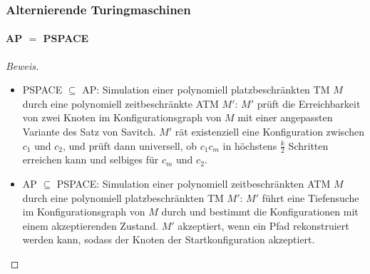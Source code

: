 \begin{frame}
    \frametitle{Alternierende Turingmaschinen}
    \framesubtitle{AP $=$ PSPACE}
    
    \begin{proof}[Beweis]
        \begin{itemize}
            \item PSPACE $\subseteq$ AP: Simulation einer polynomiell platzbeschränkten TM $M$ durch eine polynomiell zeitbeschränkte ATM $M'$: $M'$ prüft die Erreichbarkeit von zwei Knoten im Konfigurationsgraph von $M$ mit einer angepassten Variante des Satz von Savitch. $M'$ rät existenziell eine Konfiguration zwischen $c_1$ und $c_2$, und prüft dann universell, ob $c_1 c_m$ in höchstens $\frac{k}{2}$ Schritten erreichen kann und selbiges für $c_m$ und $c_2$.
            \item AP $\subseteq$ PSPACE: Simulation einer polynomiell zeitbeschränkten ATM $M$ durch eine polynomiell platzbeschränkten TM $M'$: $M'$ führt eine Tiefensuche im Konfigurationsgraph von $M$ durch und bestimmt die Konfigurationen mit einem akzeptierenden Zustand. $M'$ akzeptiert, wenn ein Pfad rekonstruiert werden kann, sodass der Knoten der Startkonfiguration akzeptiert. 
        \end{itemize}
    \end{proof}
\end{frame}